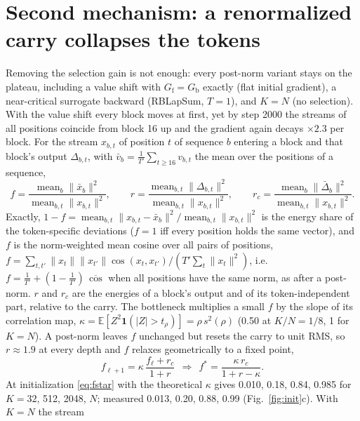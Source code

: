 \documentclass[10pt,a4paper]{article}
\newcommand{\Gf}{G_{\mathrm f}}
\newcommand{\Gb}{G_{\mathrm b}}
\begin{document}
\section{Second mechanism: a renormalized carry collapses the tokens}

Removing the selection gain is not enough: every post-norm variant stays on the plateau, including a value
shift with \(\Gf=\Gb\) exactly (flat initial gradient), a near-critical surrogate backward (RBLapSum, \(T=1\)),
and \(K=N\) (no selection).  With the value shift every block moves at first, yet by step 2000 the streams of
all positions coincide from block 16 up and the gradient again decays \(\times2.3\) per block.  For the stream \(x_{b,t}\) of position \(t\) of sequence \(b\) entering a block and that block's
output \(\Delta_{b,t}\), with \(\bar v_b=\frac1{T'}\sum_{t\ge16}v_{b,t}\) the mean over the positions of a sequence,
\begin{equation*}
  f=\frac{\operatorname{mean}_b\|\bar x_b\|^2}{\operatorname{mean}_{b,t}\|x_{b,t}\|^2},\qquad
  r=\frac{\operatorname{mean}_{b,t}\|\Delta_{b,t}\|^2}{\operatorname{mean}_{b,t}\|x_{b,t}\|^2},\qquad
  r_c=\frac{\operatorname{mean}_b\|\bar\Delta_b\|^2}{\operatorname{mean}_{b,t}\|x_{b,t}\|^2}.
\end{equation*}
Exactly, \(1-f=\operatorname{mean}_{b,t}\|x_{b,t}-\bar x_b\|^2/\operatorname{mean}_{b,t}\|x_{b,t}\|^2\) is the energy share of
the token-specific deviations (\(f=1\) iff every position holds the same vector), and \(f\) is the norm-weighted
mean cosine over all pairs of positions,
\(f=\sum_{t,t'}\|x_t\|\|x_{t'}\|\cos(x_t,x_{t'})/(T'\sum_t\|x_t\|^2)\), i.e.\ \(f=\tfrac1{T'}+(1-\tfrac1{T'})\,\overline{\cos}\) when all
positions have the same norm, as after a post-norm.  \(r\) and \(r_c\) are the energies of a block's output and of
its token-independent part, relative to the carry.  The bottleneck multiplies a small \(f\) by the slope of its
correlation map, \(\kappa=\mathbb E[Z^2\mathbf 1(|Z|>t_\rho)]=\rho\,s^2(\rho)\) (0.50 at \(K/N=1/8\), 1 for
\(K=N\)).  A post-norm leaves \(f\) unchanged but resets the carry to unit RMS, so \(r\approx1.9\) at every depth
and \(f\) relaxes geometrically to a fixed point,
\begin{equation}
  f_{\ell+1}=\kappa\,\frac{f_\ell+r_c}{1+r}\ \ \Longrightarrow\ \
  f^\ast=\frac{\kappa\,r_c}{1+r-\kappa}.
  \label{eq:fstar}
\end{equation}
At initialization \eqref{eq:fstar} with the theoretical \(\kappa\) gives 0.010, 0.18, 0.84, 0.985 for
\(K=32\), 512, 2048, \(N\); measured 0.013, 0.20, 0.88, 0.99 (Fig.~\ref{fig:init}c).  With \(K=N\) the stream
\end{document}
